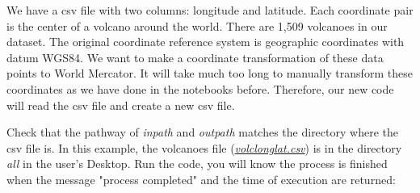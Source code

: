 \documentclass[a4paper , 12pt]{book}
\begin{document}
We have a csv file with two columns: longitude and latitude. Each coordinate pair is the center of a volcano around the world. There are 1,509 volcanoes in our dataset. The original coordinate reference system is geographic coordinates with datum WGS84. We want to make a coordinate transformation of these data points to World Mercator. It will take much too long to manually transform these coordinates as we have done in the notebooks before. Therefore, our new code will read the csv file and create a new csv file.

Check that the pathway of \textit{in\textunderscore path} and \textit{out\textunderscore path} matches the directory where the csv file is. In this example, the volcanoes file (\href{http://github.com}{\textit{volc\textunderscore longlat.csv}}) is in the directory \textit{all} in the user's Desktop. Run the code, you will know the process is finished when the message "process completed" and the time of execution are returned:
\end{document}
